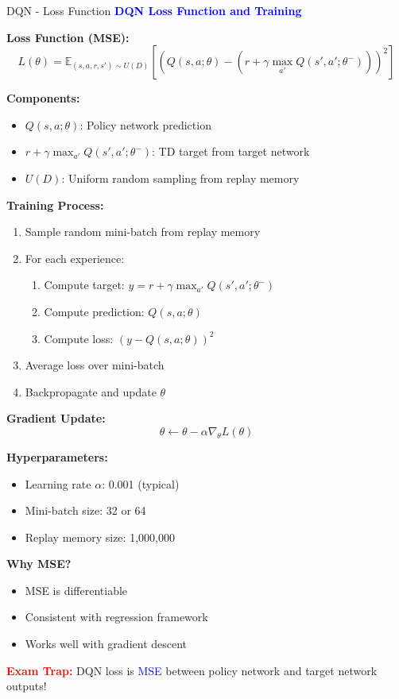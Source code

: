 \documentclass[8pt]{beamer}
\begin{document}
	\begin{frame}{DQN - Loss Function}
		\fontsize{6.5}{7.5}\selectfont
		\textcolor{blue}{\textbf{DQN Loss Function and Training}}
		
		\textbf{Loss Function (MSE):}
		\[
		L(\theta) = \mathbb{E}_{(s,a,r,s') \sim U(D)}[(Q(s,a;\theta) - (r + \gamma \max_{a'} Q(s',a';\theta^-)))^2]
		\]
		
		\textbf{Components:}
		\begin{itemize}
			\item $Q(s,a;\theta)$: Policy network prediction
			\item $r + \gamma \max_{a'} Q(s',a';\theta^-)$: TD target from target network
			\item $U(D)$: Uniform random sampling from replay memory
		\end{itemize}
		
		\textbf{Training Process:}
		\begin{enumerate}
			\item Sample random mini-batch from replay memory
			\item For each experience:
			\begin{enumerate}
				\item Compute target: $y = r + \gamma \max_{a'} Q(s',a';\theta^-)$
				\item Compute prediction: $Q(s,a;\theta)$
				\item Compute loss: $(y - Q(s,a;\theta))^2$
			\end{enumerate}
			\item Average loss over mini-batch
			\item Backpropagate and update $\theta$
		\end{enumerate}
		
		\textbf{Gradient Update:}
		\[
		\theta \leftarrow \theta - \alpha \nabla_\theta L(\theta)
		\]
		
		\textbf{Hyperparameters:}
		\begin{itemize}
			\item Learning rate $\alpha$: 0.001 (typical)
			\item Mini-batch size: 32 or 64
			\item Replay memory size: 1,000,000
		\end{itemize}
		
		\textbf{Why MSE?}
		\begin{itemize}
			\item MSE is differentiable
			\item Consistent with regression framework
			\item Works well with gradient descent
		\end{itemize}
		
		\textcolor{red}{\textbf{Exam Trap:}} DQN loss is \textcolor{blue}{MSE} between policy network and target network outputs!
	\end{frame}
	
\end{document}
